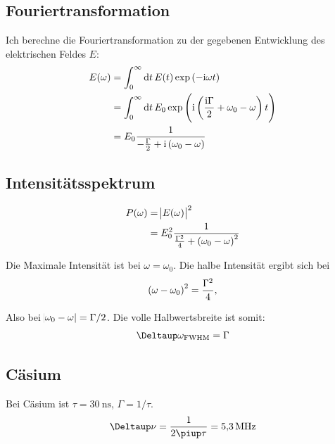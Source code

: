 \subsection{Fouriertransformation}

Ich berechne die Fouriertransformation zu der gegebenen Entwicklung des
elektrischen Feldes $E$:
\begin{align*}
	E(\omega)
	&= \int_0^\infty \dif t \, E(t) \exp\del{-\ii \omega t} \\
	&= \int_0^\infty \dif t \, E_0 \exp\del{\ii \del{\frac{\ii \Gamma}2 + \omega_0 - \omega} t} \\
	&= E_0 \frac1{-\frac \Gamma2 + \ii \del{\omega_0 - \omega}}
\end{align*}

\subsection{Intensitätsspektrum}

\begin{align*}
	P(\omega)
	&= \abs{E(\omega)}^2 \\
	&= E_0^2 \frac1{\frac{\Gamma^2}4 + \del{\omega_0 - \omega}^2}
\end{align*}

Die Maximale Intensität ist bei $\omega = \omega_0$. Die halbe Intensität ergibt sich bei
\[
	\del{\omega - \omega_0}^2 = \frac{\Gamma^2}4,
\]

Also bei $\abs{\omega_0 - \omega} = \Gamma / 2$. Die volle Halbwertsbreite ist
somit:
\[
	\Deltaup \omega_\text{FWHM} = \Gamma
\]

\subsection{Cäsium}

Bei Cäsium ist $\tau = \SI{30}{\nano\second}$, $\Gamma = 1/\tau$.
\[
	\Deltaup\nu = \frac{1}{2 \piup\tau} = \SI{5.3}{\mega\hertz}
\]


\IfFileExists{\bibliographyfile}{
	
}{}



